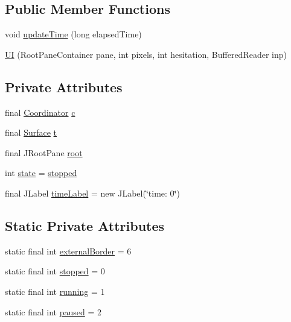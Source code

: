 \subsection*{Public Member Functions}
\begin{DoxyCompactItemize}
\item 
void \hyperlink{classUI_ac914f62de725a340392e01027daf6c92}{update\-Time} (long elapsed\-Time)
\item 
\hyperlink{classUI_a38385bac9498fca02075c540c94dfb1b}{U\-I} (Root\-Pane\-Container pane, int pixels, int hesitation, Buffered\-Reader inp)
\end{DoxyCompactItemize}
\subsection*{Private Attributes}
\begin{DoxyCompactItemize}
\item 
final \hyperlink{classCoordinator}{Coordinator} \hyperlink{classUI_ae995cfefdd6a9abe14d92da9eb82a0e5}{c}
\item 
final \hyperlink{classSurface}{Surface} \hyperlink{classUI_a906f7250b5e2e31ee5c5db17514b6d4e}{t}
\item 
final J\-Root\-Pane \hyperlink{classUI_a9164dec043cc2849bad9e01de7919ce8}{root}
\item 
int \hyperlink{classUI_a016b1d8d5b1bdc3391322c0472b2b565}{state} = \hyperlink{classUI_a48163c6e2e10d9b13ddf30b12d262dd7}{stopped}
\item 
final J\-Label \hyperlink{classUI_aeeaff5b19707911ca9d97f526db6f077}{time\-Label} = new J\-Label(\char`\"{}time\-: 0\char`\"{})
\end{DoxyCompactItemize}
\subsection*{Static Private Attributes}
\begin{DoxyCompactItemize}
\item 
static final int \hyperlink{classUI_afb0f2cb14286204c475dc199d4ed79ba}{external\-Border} = 6
\item 
static final int \hyperlink{classUI_a48163c6e2e10d9b13ddf30b12d262dd7}{stopped} = 0
\item 
static final int \hyperlink{classUI_af5e146150e3739db87e209d6d77a5199}{running} = 1
\item 
static final int \hyperlink{classUI_ade79dbf5da2369fd6a7f4862d9e8a41f}{paused} = 2
\end{DoxyCompactItemize}


